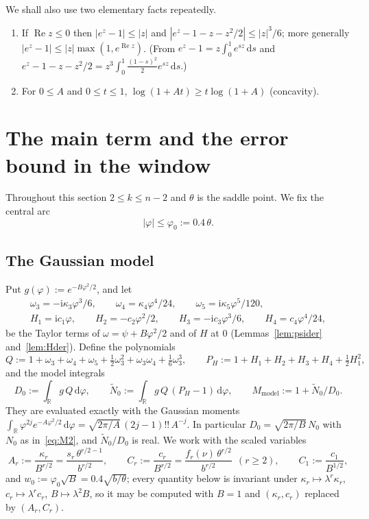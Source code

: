 \documentclass[11pt]{amsart}
\theoremstyle{definition}
\theoremstyle{remark}
\numberwithin{equation}{section}
\newcommand{\RR}{\mathbb{R}}
\newcommand{\re}{\operatorname{Re}}
\newcommand{\dd}{\,\mathrm{d}}
\newcommand{\ii}{\mathrm{i}}
\begin{document}
We shall also use two elementary facts repeatedly.
\begin{enumerate}[label=(F\arabic*)]
\item\label{F1} If $\re z\le0$ then $|e^z-1|\le|z|$ and $|e^z-1-z-z^2/2|\le|z|^3/6$; more generally
  $|e^z-1|\le|z|\max(1,e^{\re z})$. (From $e^z-1=z\int_0^1e^{sz}\dd s$ and $e^z-1-z-z^2/2=z^3\int_0^1\frac{(1-s)^2}{2}e^{sz}\dd s$.)
\item\label{F2} For $0\le A$ and $0\le t\le1$, $\log(1+At)\ge t\log(1+A)$ (concavity).
\end{enumerate}

\section{The main term and the error bound in the window}\label{sec:main}

Throughout this section $2\le k\le n-2$ and $\theta$ is the saddle point. We fix the central arc
\[
  |\varphi|\le\varphi_0:=0.4\,\theta .
\]

\subsection{The Gaussian model}
Put $g(\varphi):=e^{-B\varphi^2/2}$, and let
\[
\begin{gathered}
  \omega_3=-\ii\kappa_3\varphi^3/6,\qquad \omega_4=\kappa_4\varphi^4/24,\qquad \omega_5=\ii\kappa_5\varphi^5/120,\\
  H_1=\ii c_1\varphi,\qquad H_2=-c_2\varphi^2/2,\qquad H_3=-\ii c_3\varphi^3/6,\qquad H_4=c_4\varphi^4/24,
\end{gathered}
\]
be the Taylor terms of $\omega=\psi+B\varphi^2/2$ and of $H$ at $0$ (Lemmas~\ref{lem:psider} and~\ref{lem:Hder}). Define the
polynomials
\[
  Q:=1+\omega_3+\omega_4+\omega_5+\tfrac12\omega_3^2+\omega_3\omega_4+\tfrac16\omega_3^3,\qquad
  P_H:=1+H_1+H_2+H_3+H_4+\tfrac12H_1^2,
\]
and the model integrals
\[
  D_0:=\int_\RR g\,Q\dd\varphi,\qquad \tilde N_0:=\int_\RR g\,Q\,(P_H-1)\dd\varphi,\qquad M_{\mathrm{model}}:=1+\tilde N_0/D_0 .
\]
They are evaluated exactly with the Gaussian moments $\int_\RR\varphi^{2j}e^{-A\varphi^2/2}\dd\varphi=\sqrt{2\pi/A}\,(2j-1)!!\,A^{-j}$.
In particular $D_0=\sqrt{2\pi/B}\,N_0$ with $N_0$ as in~\eqref{eq:M2}, and $\tilde N_0/D_0$ is real. We work with the scaled variables
\begin{equation}\label{eq:AC}
  A_r:=\frac{\kappa_r}{B^{r/2}}=\frac{s_r\,\theta^{r/2-1}}{b^{r/2}},\qquad C_r:=\frac{c_r}{B^{r/2}}=\frac{f_r(\nu)\,\theta^{r/2}}{b^{r/2}}\ \ (r\ge2),\qquad
  C_1:=\frac{c_1}{B^{1/2}},
\end{equation}
and $w_0:=\varphi_0\sqrt B=0.4\sqrt{b/\theta}$; every quantity below is invariant under $\kappa_r\mapsto\lambda^r\kappa_r$,
$c_r\mapsto\lambda^rc_r$, $B\mapsto\lambda^2B$, so it may be computed with $B=1$ and $(\kappa_r,c_r)$ replaced by $(A_r,C_r)$.
\end{document}

